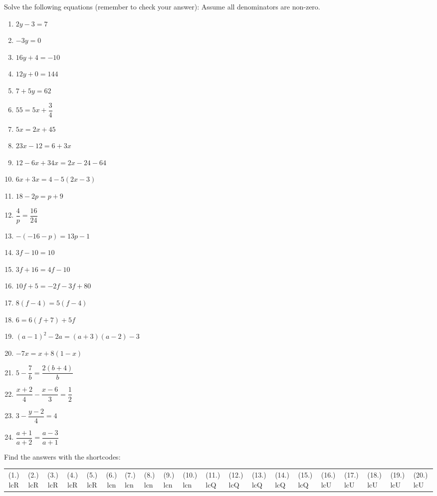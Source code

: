 \begin{exercises}{}
{
Solve the following equations (remember to check your answer):
Assume all denominators are non-zero.
\begin{multicols}{2}
\begin{enumerate}[noitemsep, label=\textbf{\arabic*}. ] 
\item   $2y-3=7$
\item   $-3y=0$        
\item   $16y+4=-10$        
\item   $12y+0=144$
\item   $7+5y=62$   \vspace{6pt}     
\item  $55=5x+\dfrac{3}{4}$ \vspace{6pt}
\item   $5x=2x+45$        
\item  $23x-12=6+3x$
\item   $12-6x+34x=2x-24-64$
\item   $6x+3x=4-5(2x-3)$
\item   $18-2p=p+9$   \vspace{6pt}
\item   $\dfrac{4}{p}=\dfrac{16}{24}$
\item   $-(-16-p)=13p-1$
\item   $3f-10=10$
\item   $3f+16=4f-10$
\item   $10f+5=-2f-3f+80$
\item   $8(f-4)=5(f-4)$
\item  $6=6(f+7)+5f$      
\item $(a-1)^{2} - 2a = (a+3)(a-2) - 3$
\item $-7x = x+8(1-x)$ \vspace{6pt}
\item $5-\dfrac{7}{b} = \dfrac{2(b+4)}{b}$\vspace{6pt}
\item $\dfrac{x+2}{4} - \dfrac{x-6}{3} = \dfrac{1}{2}$\vspace{6pt}
\item $ 3 - \dfrac{y-2}{4} = 4$\vspace{6pt}
\item $ \dfrac{a+1}{a+2} = \dfrac{a-3}{a+1}$
  
\end{enumerate}
\end{multicols}
\par {} Find the answers with the shortcodes:
\par \begin{tabular}[h]{cccccc}
(1.) lcR  &  (2.) lcR  &  (3.) lcR  &  (4.) lcR  &  (5.) lcR  &  (6.) lcn  &  (7.) lcn  &  (8.) lcn  &  (9.) lcn  &  (10.) lcn  &  (11.) lcQ  &  (12.) lcQ  &  (13.) lcQ  &  (14.) lcQ  &  (15.) lcQ  &  (16.) lcU  &  (17.) lcU  &  (18.) lcU  &  (19.) lcU  &  (20.) lcU  & \end{tabular}
}
\end{exercises}

